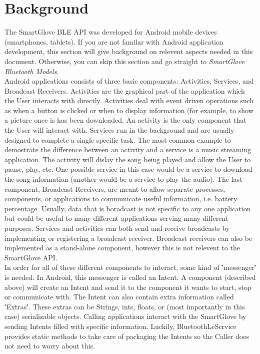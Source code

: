 \documentclass{scrreprt}
\begin{document}
\section{Background}
The SmartGlove BLE API was developed for Android mobile devices (smartphones, tablets).
If you are not familar with Android application development, this section will give background 
on relevent aspects needed in this document. Otherwise, you can skip this section and
go straight to \textit{SmartGlove Bluetooth Models}.\\
Android applications consists of three basic components: Activities, Services, and Broadcast Receivers.
Activities are the graphical part of the application which the User interacts with directly.
Activities deal with event driven operations such as when a button is clicked or when to 
display information (for example, to show a picture once is has been downloaded.
An activity is the only component that the User will interact with. Services run in the
background and are usually designed to complete a single specific task. The most common
example to demostrate the difference between an activity and a service is a music streaming
application. The activity will dislay the song being played and allow the User to pause, play, etc.
One possible service in this case would be a service to download the song information (another
would be a service to play the audio). The last component, Broadcast Receivers, are meant to
allow separate processes, components, or applications to communicate useful information, i.e. battery percentage.
Usually, data that is boradcast is not specific to any one application but could be useful to many
different applications serving many different purposes. Services and activities can both send
and receive broadcasts by implementing or registering a broadcast receiver. Broadcast 
receivers can also be implemented as a stand-alone component, however this is not relevent
to the SmartGlove API.\\
In order for all of these different components to interact, some kind of \''messenger\'' is
needed. In Android, this messenger is called an Intent. A component (described above)
will create an Intent and send it to the component it wants to start, stop or communicate with.
The Intent can also contain extra information called \''Extras\''. These extras can be
Strings, ints, floats, or (most importantly in this case) serializable objects. Calling applications 
interact with the SmartGlove by sending Intents filled with specific information. Luckily, BluetoothLeService
provides static methods to take care of packaging the Intents so the Caller does not need to worry
about this.
\end{document}
